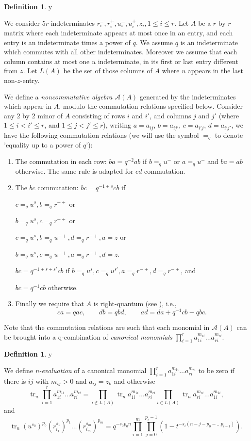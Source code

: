 \documentclass{amsart}
\theoremstyle{plain}
\theoremstyle{definition}
\newtheorem{definition}[proposition]{Definition}
\theoremstyle{remark}
\def\printname#1{
        \if\draft y
                \smash{\makebox[0pt]{\hspace{-0.5in}
                        \raisebox{8pt}{\tt\tiny #1}}}
        \fi
}
\newcommand{\tr}{\operatorname{tr}}
\def\lbl#1{\label{#1}\printname{#1}}
\def\A{\mathcal A}
\begin{document}
\begin{definition}
\lbl{def.com}
We consider $5r$ indeterminates $r^-_i,r^+_i,u^-_i,u^+_i,z_i, 1\leq i\leq r$.
 Let $A$ be a $r$ by $r$ matrix where each indeterminate appears at most once
in an entry, and each entry is an indeterminate times a power of $q$.
 We assume $q$ is an indeterminate which commutes with all other 
indeterminates. 
Moreover we assume that each column contains at most one $u$ indeterminate, 
in its first
or last entry different from $z$. Let $L(A)$ be the set of those columns of $A$
where $u$ appears in the last non-$z$-entry. 

We define a {\em noncommutative algebra} $\A(A)$ generated by the 
indeterminates which appear in $A$, modulo 
the commutation relations specified below. Consider any $2$ by $2$ minor
 of $A$ consisting of rows $i$ and $i'$, and columns $j$ and $j'$ 
(where $1\leq i <i'\leq r$, and $1\leq j <j'\leq r$), writing $a=a_{ij}$, 
$b=a_{ij'}$, $c=a_{i'j}$, $d=a_{i'j'}$, we have the following commutation 
relations
(we will use the symbol $=_q$ to denote 'equality up to a power of $q$'): 
\begin{enumerate}
\item
The commutation in each row:
 $ba= q^{-2}ab$ if $b=_q u^-$ or $a=_q u^-$ and $ba= ab$ otherwise. 
The same rule is adapted for $cd$ commutation.
\item
The $bc$ commutation: $bc= q^{-1+s}cb$ if
 
$c=_q u^s, b=_q r^{-+}$ or 

$b=_q u^s, c=_q r^{-+}$ or

$c=_q u^s, b=_q u^{-+}, d=_q r^{-+}, a= z$ or

$b=_q u^s, c=_q u^{-+}, a=_q r^{-+}, d= z$.

$bc= q^{-1+s+s'}cb$ if $b=_q u^s, c=_q u^{s'}, a=_q r^{-+}, d=_q r^{-+}$, and

$bc = q^{-1}cb$ otherwise.
\item
Finally we require that $A$ is right-quantum (see \cite{GLZ}), i.e.,
$$ 
ca=qac, \qquad  db=qbd, \qquad 
ad=da +q^{-1}cb -qbc.
$$
\end{enumerate}
\end{definition}

Note that the commutation relations are such that
each monomial in $\A(A)$ can be brought into a q-combination of {\em canonical
monomials} $\prod_{i=1}^r a_{1i}^{m_{1i}}\dots a_{ri}^{m_{ri}}$.

\begin{definition}
\lbl{def.eval}
We define {\em n-evaluation} of a canonical monomial 
$\prod_{i=1}^r a_{1i}^{m_{1i}}\dots a_{ri}^{m_{ri}}$
to be zero if there is $ij$ with $m_{ij}> 0$ and $a_{ij}= z_k$ and otherwise
$$
\tr_n\prod_{i=1}^r a_{1i}^{m_{1i}}\dots a_{ri}^{m_{ri}}=
\prod_{i\notin L(A)}\tr_n a_{1i}^{m_{1i}}\dots a_{ri}^{m_{ri}}
\prod_{i\in L(A)}\tr_n a_{ri}^{m_{ri}}\dots a_{1i}^{m_{1i}},
$$
and
$$
\tr_n (u^{s_0})^{p_0}(r_{i_1}^{s_1})^{p_1}\dots (r_{i_m}^{s_m})^{p_m}=
q^{-s_0p_0n}\prod_{i=1}^m\prod_{j=0}^{p_i-1}
(1-t^{-s_i(n-j-p_0-\dots p_{i-1})}).
$$
\end{definition}
\end{document}
